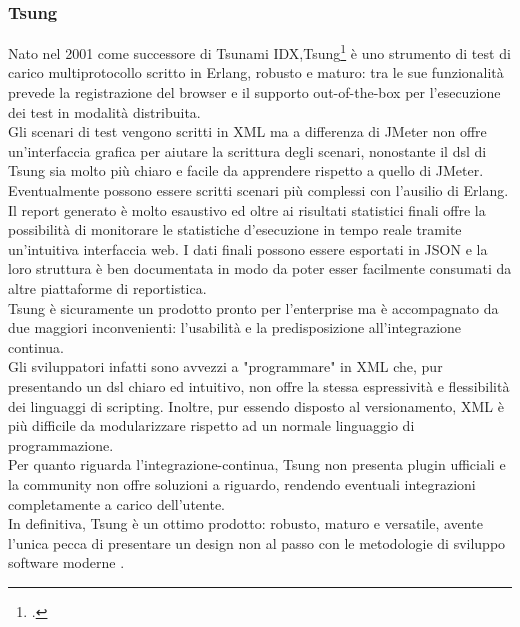 \subsubsection{Tsung}
Nato nel 2001 come successore di Tsunami IDX,Tsung\footcite{site:tsung} è uno strumento di test di carico multiprotocollo scritto in Erlang, robusto e maturo: tra le sue funzionalità prevede la registrazione del browser e il supporto \gls{out-of-the-box} per l'esecuzione dei test in modalità distribuita.\\
Gli scenari di test vengono scritti in XML ma a differenza di JMeter non offre un'interfaccia grafica per aiutare la scrittura degli scenari, nonostante il \gls{dsl} di Tsung sia molto più chiaro e facile da apprendere rispetto a quello di JMeter. Eventualmente possono essere scritti scenari più complessi con l'ausilio di Erlang. \\
Il report generato è molto esaustivo ed oltre ai risultati statistici finali offre la possibilità di monitorare le statistiche d'esecuzione in tempo reale tramite un'intuitiva interfaccia web. I dati finali possono essere esportati in JSON e la loro struttura è ben documentata in modo da poter esser facilmente consumati da altre piattaforme di reportistica.\\
Tsung è sicuramente un prodotto pronto per l'enterprise ma è accompagnato da due maggiori inconvenienti: l’usabilità e la predisposizione all’integrazione continua. \\
Gli sviluppatori infatti sono avvezzi a "programmare" in XML che, pur presentando un \gls{dsl} chiaro ed intuitivo, non offre la stessa espressività e flessibilità dei linguaggi di scripting. Inoltre, pur essendo disposto al versionamento, XML è più difficile da modularizzare rispetto ad un normale linguaggio di programmazione.\\
Per quanto riguarda l'\gls{integrazione-continua}, Tsung non presenta plugin ufficiali e la community non offre soluzioni a riguardo, rendendo eventuali integrazioni completamente a carico dell'utente.\\
In definitiva, Tsung è un ottimo prodotto: robusto, maturo e versatile, avente l'unica pecca di presentare un design non al passo con le metodologie di sviluppo software moderne	. 

